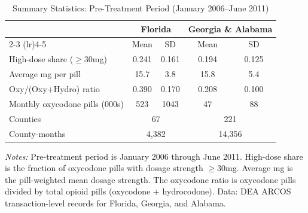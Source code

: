 \begin{table}[H]
\centering
\caption{Summary Statistics: Pre-Treatment Period (January 2006--June 2011)}
\label{tab:summary}
\begin{threeparttable}
\begin{tabular}{lcccc}
\toprule
 & \multicolumn{2}{c}{Florida} & \multicolumn{2}{c}{Georgia \& Alabama} \\
\cmidrule(lr){2-3} \cmidrule(lr){4-5}
 & Mean & SD & Mean & SD \\
\midrule
High-dose share ($\geq$30mg) & 0.241 & 0.161 & 0.194 & 0.125 \\
Average mg per pill & 15.7 & 3.8 & 15.8 & 5.4 \\
Oxy/(Oxy+Hydro) ratio & 0.390 & 0.170 & 0.208 & 0.100 \\
Monthly oxycodone pills (000s) & 523 & 1043 & 47 & 88 \\
\midrule
Counties & \multicolumn{2}{c}{67} & \multicolumn{2}{c}{221} \\
County-months & \multicolumn{2}{c}{4,382} & \multicolumn{2}{c}{14,356} \\
\bottomrule
\end{tabular}
\begin{tablenotes}[flushleft]
\small
\item \textit{Notes:} Pre-treatment period is January 2006 through June 2011. High-dose share is the fraction of oxycodone pills with dosage strength $\geq$30mg. Average mg is the pill-weighted mean dosage strength. The oxycodone ratio is oxycodone pills divided by total opioid pills (oxycodone + hydrocodone). Data: DEA ARCOS transaction-level records for Florida, Georgia, and Alabama.
\end{tablenotes}
\end{threeparttable}
\end{table}

